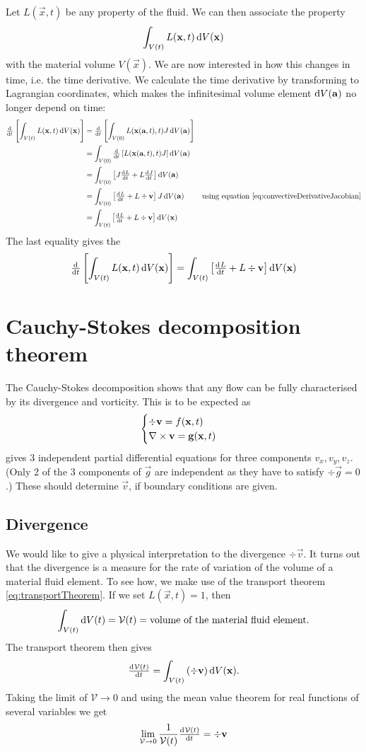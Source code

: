 Let $L(\vec{x},t)$ be any property of the fluid. We can then associate the property 
\[\int_{V(t)} L(\boldsymbol{\mathrm{x}},t) \operatorname{d \!}{V(\boldsymbol{\mathrm{x}})} \]
with the material volume $V(\vec{x})$. We are now interested in how this changes in time, i.e. the time derivative. We calculate the time derivative by transforming to Lagrangian coordinates, which makes the infinitesimal volume element $\operatorname{d \!}{V(\boldsymbol{\mathrm{a}})}$ no longer depend on time:
\begin{align*}
\od{}{t}\left[\int_{V(t)} L(\vec{x},t) \diff{V(\vec{x})}\right] &= \od{}{t}\left[\int_{V(0)} L(\vec{x}(\vec{a},t),t) J \diff{V(\vec{a})}\right] \\
&= \int_{V(0)} \od{}{t}\left[L(\vec{x}(\vec{a},t),t) J \right] \diff{V(\vec{a})} \\
&= \int_{V(0)} \left[J \od{L}{t} + L \od{J}{t} \right] \diff{V(\vec{a})} \\
&= \int_{V(0)} \left[\od{L}{t} + L \div \vec{v} \right] J \diff{V(\vec{a})} & \text{using equation \eqref{eq:convectiveDerivativeJacobian}} \\
&= \int_{V(t)} \left[\od{L}{t} + L \div \vec{v} \right] \diff{V(\vec{x})}
\end{align*}
The last equality gives the 
\begin{equation}
\od{}{t}\left[\int_{V(t)} L(\vec{x},t) \diff{V(\vec{x})}\right] = \int_{V(t)} \left[\od{L}{t} + L \div \vec{v} \right] \diff{V(\vec{x})} \label{eq:transportTheorem}
\end{equation}


\section{Cauchy-Stokes decomposition theorem}
The Cauchy-Stokes decomposition shows that any flow can be fully characterised by its divergence and vorticity. This is to be expected as
\[ \begin{cases}
\div \boldsymbol{\mathrm{v}} = f(\boldsymbol{\mathrm{x}},t) \\
\mathop{}\! \nabla\times \boldsymbol{\mathrm{v}} = \boldsymbol{\mathrm{g}}(\boldsymbol{\mathrm{x}},t)
\end{cases} \]
gives 3 independent partial differential equations for three components $v_x, v_y, v_z$. (Only 2 of the 3 components of $\vec{g}$ are independent as they have to satisfy $\div \vec{g} = 0$.) These should determine $\vec{v}$, if boundary conditions are given.
\subsection{Divergence} 
We would like to give a physical interpretation to the divergence $\div \vec{v}$. It turns out that the divergence is a measure for the rate of variation of the volume of a material fluid element. To see how, we make use of the transport theorem \eqref{eq:transportTheorem}. If we set $L(\vec{x},t) = 1$, then
\[ \int_{V(t)}\operatorname{d \!}{V(t)} = \mathcal{V}(t) = \text{volume of the material fluid element.} \]
The transport theorem then gives
\[ \od{\mathcal{V}(t)}{t} = \int_{V(t)} \left(\div\vec{v}\right)\diff{V(\vec{x})}. \]
Taking the limit of $\mathcal{V} \to 0$ and using the mean value theorem for real functions of several variables we get
\[ \lim_{\mathcal{V}\to 0} \frac{1}{\mathcal{V}(t)}\od{\mathcal{V}(t)}{t} = \div \vec{v} \]
